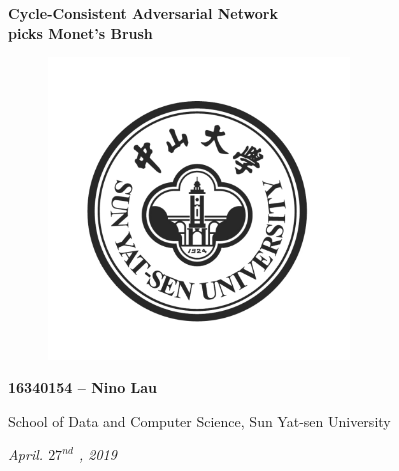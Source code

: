 \documentclass[a4paper]{article}
\begin{document}
\vspace{6mm}
\begin{center}
\huge\textbf{Cycle-Consistent Adversarial Network \\}
\vspace{3mm}
\huge\textbf{picks Monet's Brush}
\end{center}
\vspace{3mm}

\begin{figure}[H]
\centering
\includegraphics[width=8cm,height=8cm]{sysu.png}
\end{figure}

\vspace{2mm}
\begin{center}
\large\textbf{16340154 -- Nino Lau }\\
\end{center}

\begin{center}
\normalsize{School of Data and Computer Science, Sun Yat-sen University}
\end{center}

\begin{center}
\textit{April. $27^{nd}$ \textit, 2019\\}
\end{center}
\vspace{5mm}
\end{document}

